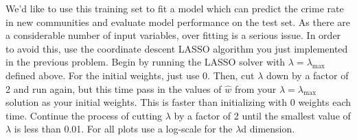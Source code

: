 \documentclass{article}
\newcommand{\1}{\mathbf{1}}
\begin{document}
We’d like to use this training set to fit a model which can predict the crime rate in new communities and evaluate model performance on the test set. As there are a considerable number of input variables, over fitting is a serious issue. In order to avoid this, use the coordinate descent LASSO algorithm you just implemented in the previous problem. Begin by running the LASSO solver with $\lambda = \lambda_{\max}$ defined above. For the initial weights, just use 0. Then, cut $\lambda$ down by a factor of 2 and run again, but this time pass in the values of $\widehat w$ from your $\lambda = \lambda_{\max}$ solution as your initial weights. This is faster than initializing with 0 weights each time. Continue the process of cutting $\lambda$ by a factor of 2 until the smallest value of $\lambda$ is less than 0.01. For all plots use a log-scale for the $\lambda$d dimension.
\end{document}
